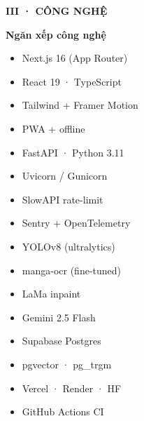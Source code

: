 \documentclass[aspectratio=169,10pt]{beamer}
\newcommand{\kick}[1]{{\headfont\bfseries\footnotesize\textcolor{mred}{\MakeUppercase{#1}}}}
\newcommand{\slidehead}[2]{%
  \kick{#1}\par\vspace{0.6mm}%
  {\headfont\bfseries\LARGE\textcolor{ink}{#2}}\par\vspace{1.2mm}}
\begin{document}
\begin{frame}
\slidehead{III · Công nghệ}{Ngăn xếp công nghệ}
\vspace{0.5mm}\small
\begin{tcbraster}[raster columns=4, raster equal height=rows, raster column skip=2.5mm]
\begin{tcolorbox}[card,colbacktitle=mred,coltitle=white,title={Frontend}]
\begin{itemize}\setlength\itemsep{0.6mm}\item Next.js 16 (App Router)\item React 19 · TypeScript\item Tailwind + Framer Motion\item PWA + offline\end{itemize}\end{tcolorbox}
\begin{tcolorbox}[card,colbacktitle=ink,coltitle=white,title={Backend}]
\begin{itemize}\setlength\itemsep{0.6mm}\item FastAPI · Python 3.11\item Uvicorn / Gunicorn\item SlowAPI rate-limit\item Sentry + OpenTelemetry\end{itemize}\end{tcolorbox}
\begin{tcolorbox}[card,colbacktitle=mgreen,coltitle=white,title={AI / ML}]
\begin{itemize}\setlength\itemsep{0.6mm}\item YOLOv8 (ultralytics)\item manga-ocr (fine-tuned)\item LaMa inpaint\item Gemini 2.5 Flash\end{itemize}\end{tcolorbox}
\begin{tcolorbox}[card,colbacktitle=mblue,coltitle=white,title={Dữ liệu \& Hạ tầng}]
\begin{itemize}\setlength\itemsep{0.6mm}\item Supabase Postgres\item pgvector · pg\_trgm\item Vercel · Render · HF\item GitHub Actions CI\end{itemize}\end{tcolorbox}
\end{tcbraster}
\vspace{1.5mm}{\footnotesize\textcolor{slate}{Mọi thứ chạy trên tier miễn phí/rẻ nhưng vẫn đạt chuẩn production.}}
\end{frame}
\end{document}
